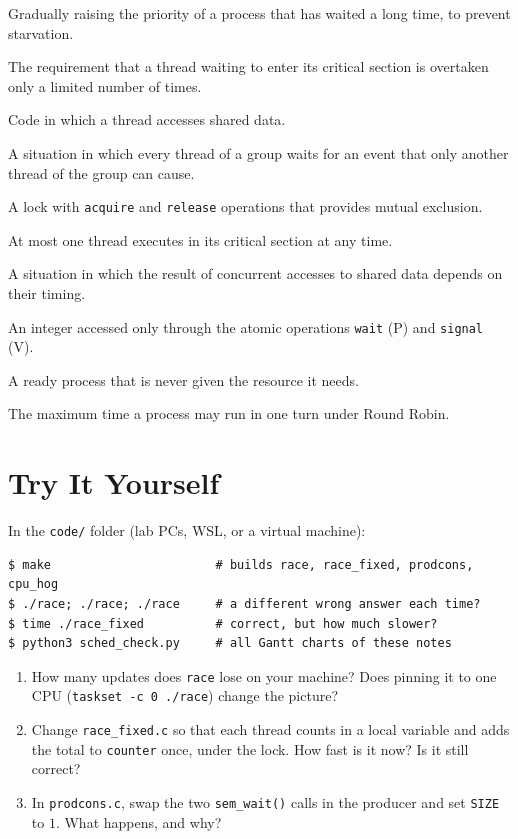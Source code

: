 \documentclass[11pt,a4paper]{article}
\newcommand{\cmd}[1]{\texttt{#1}}
\begin{document}
\begin{description}[leftmargin=1em,labelindent=0pt,itemsep=0.1em]
  \item[Aging] Gradually raising the priority of a process that has waited a long time, to prevent starvation.
  \item[Bounded waiting] The requirement that a thread waiting to enter its critical section is overtaken only a limited number of times.
  \item[Critical section] Code in which a thread accesses shared data.
  \item[Deadlock] A situation in which every thread of a group waits for an event that only another thread of the group can cause.
  \item[Mutex lock] A lock with \texttt{acquire} and \texttt{release} operations that provides mutual exclusion.
  \item[Mutual exclusion] At most one thread executes in its critical section at any time.
  \item[Race condition] A situation in which the result of concurrent accesses to shared data depends on their timing.
  \item[Semaphore] An integer accessed only through the atomic operations \texttt{wait} (P) and \texttt{signal} (V).
  \item[Starvation] A ready process that is never given the resource it needs.
  \item[Time quantum] The maximum time a process may run in one turn under Round Robin.
\end{description}

\section{Try It Yourself}

\begin{tryit}
In the \texttt{code/} folder (lab PCs, WSL, or a virtual machine):
\begin{lstlisting}[style=term]
$ make                       # builds race, race_fixed, prodcons, cpu_hog
$ ./race; ./race; ./race     # a different wrong answer each time?
$ time ./race_fixed          # correct, but how much slower?
$ python3 sched_check.py     # all Gantt charts of these notes
\end{lstlisting}
\begin{enumerate}[leftmargin=1.4em]
  \item How many updates does \texttt{race} lose on your machine? Does pinning it to one CPU (\cmd{taskset -c 0 ./race}) change the picture?
  \item Change \texttt{race\_fixed.c} so that each thread counts in a local variable and adds the total to \texttt{counter} once, under the lock. How fast is it now? Is it still correct?
  \item In \texttt{prodcons.c}, swap the two \cmd{sem\_wait()} calls in the producer and set \texttt{SIZE} to $1$. What happens, and why?
\end{enumerate}
\end{tryit}
\end{document}

